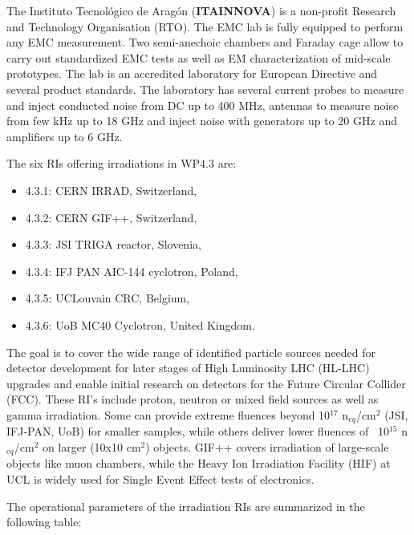 The Instituto Tecnológico de Aragón (\textbf{ITAINNOVA}) is a non-profit Research and Technology Organisation (RTO). The EMC lab is fully equipped to perform any EMC measurement. Two
semi-anechoic chambers and Faraday cage allow to carry out standardized EMC tests as well as EM characterization of mid-scale prototypes. The lab is an accredited laboratory for European Directive and several product standards. The laboratory has several current probes to measure and inject conducted noise from DC up to 400 MHz, antennas to measure noise from few kHz up to 18 GHz and inject noise with generators up to 20 GHz and amplifiers up to 6 GHz.

The six RIs offering irradiations in WP4.3 are:
\begin{itemize}
    \item	4.3.1: CERN IRRAD, Switzerland,
    \item	4.3.2: CERN GIF++, Switzerland,
    \item	4.3.3: JSI TRIGA reactor, Slovenia,
    \item	4.3.4: IFJ PAN AIC-144 cyclotron, Poland,
    \item	4.3.5: UCLouvain CRC, Belgium,
    \item	4.3.6: UoB MC40 Cyclotron, United Kingdom.
\end{itemize}

The goal is to cover the wide range of identified particle sources needed for detector development for later stages of High Luminosity LHC (HL-LHC) upgrades and enable initial research on detectors for the Future Circular Collider (FCC). These RI’s include proton, neutron or mixed field sources as well as gamma irradiation. Some can provide extreme fluences beyond 10$^{17}$ n$_{eq}$/cm$^2$ (JSI, IFJ-PAN, UoB) for smaller samples, while others deliver lower fluences of ~10$^{15}$ n$_{eq}$/cm$^2$ on larger (10x10 cm$^2$) objects. GIF++ covers irradiation of large-scale objects like muon chambers, while the Heavy Ion Irradiation Facility (HIF) at UCL is widely used for Single Event Effect tests of electronics. 

The operational parameters of the irradiation RIs are summarized in the following table:

